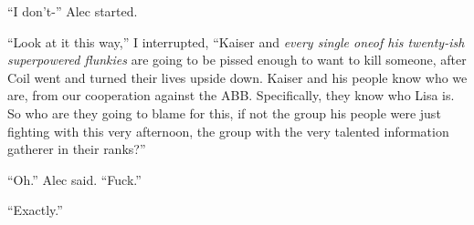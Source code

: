 ``I don't-'' Alec started.



``Look at it this way,'' I interrupted, ``Kaiser and \emph{every single one}\emph{of his twenty-ish superpowered flunkies }are going to be pissed enough to want to kill someone, after Coil went and turned their lives upside down.  Kaiser and his people know who we are, from our cooperation against the ABB.  Specifically, they know who Lisa is.  So who are they going to blame for this, if not the group his people were just fighting with this very afternoon, the group with the very talented information gatherer in their ranks?''



``Oh.''  Alec said.  ``Fuck.''



``Exactly.''





